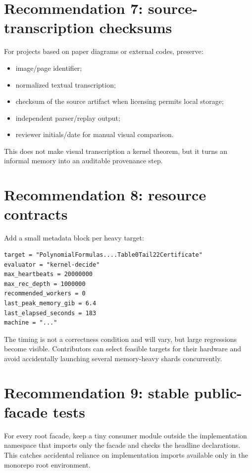 \documentclass[
  10pt,
  a4paper,
  twoside,
  open=any,
  parskip=half,
  headings=big
]{scrreprt}
\begin{document}
\section{Recommendation 7: source-transcription checksums}

For projects based on paper diagrams or external codes, preserve:

\begin{itemize}
  \item image/page identifier;
  \item normalized textual transcription;
  \item checksum of the source artifact when licensing permits local storage;
  \item independent parser/replay output;
  \item reviewer initials/date for manual visual comparison.
\end{itemize}

This does not make visual transcription a kernel theorem, but it turns an
informal memory into an auditable provenance step.

\section{Recommendation 8: resource contracts}

Add a small metadata block per heavy target:

\begin{lstlisting}[language={}]
target = "PolynomialFormulas....Table0Tail22Certificate"
evaluator = "kernel-decide"
max_heartbeats = 20000000
max_rec_depth = 1000000
recommended_workers = 0
last_peak_memory_gib = 6.4
last_elapsed_seconds = 183
machine = "..."
\end{lstlisting}

The timing is not a correctness condition and will vary, but large regressions
become visible.  Contributors can select feasible targets for their hardware
and avoid accidentally launching several memory-heavy shards concurrently.

\section{Recommendation 9: stable public-facade tests}

For every root facade, keep a tiny consumer module outside the implementation
namespace that imports only the facade and checks the headline declarations.
This catches accidental reliance on implementation imports available only in
the monorepo root environment.
\end{document}
